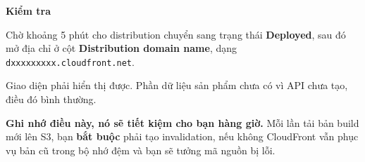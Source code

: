 \vspace{0.5em}\noindent\textbf{Kiểm tra}\par

Chờ khoảng 5 phút cho distribution chuyển sang trạng thái
\textbf{Deployed}, sau đó mở địa chỉ ở cột \textbf{Distribution domain
name}, dạng \texttt{dxxxxxxxxx.cloudfront.net}.

Giao diện phải hiển thị được. Phần dữ liệu sản phẩm chưa có vì API chưa
tạo, điều đó bình thường.

\textbf{Ghi nhớ điều này, nó sẽ tiết kiệm cho bạn hàng giờ.} Mỗi lần tải
bản build mới lên S3, bạn \textbf{bắt buộc} phải tạo invalidation, nếu
không CloudFront vẫn phục vụ bản cũ trong bộ nhớ đệm và bạn sẽ tưởng mã
nguồn bị lỗi.

\begin{Shaded}
\begin{Highlighting}[]
 \OperatorTok{\textless{}}\OperatorTok{\textgreater{}}
\end{Highlighting}
\end{Shaded}
